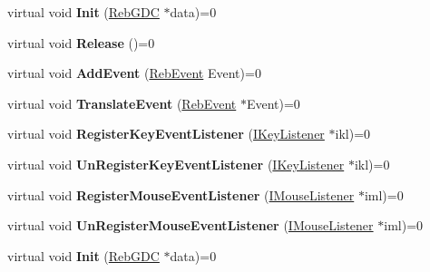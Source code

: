 \begin{DoxyCompactItemize}
\item 
virtual void {\bfseries Init} (\hyperlink{class_reb_g_d_c}{Reb\+G\+DC} $\ast$data)=0\hypertarget{class_i_m_e_h_a808b102bf9f8281aef8b4cb17652613c}{}\label{class_i_m_e_h_a808b102bf9f8281aef8b4cb17652613c}

\item 
virtual void {\bfseries Release} ()=0\hypertarget{class_i_m_e_h_ac47c3471945c993f1b4dfb35d8dd4a23}{}\label{class_i_m_e_h_ac47c3471945c993f1b4dfb35d8dd4a23}

\item 
virtual void {\bfseries Add\+Event} (\hyperlink{union_reb_event}{Reb\+Event} Event)=0\hypertarget{class_i_m_e_h_aa12fb49a27156061fe02c56b928963e5}{}\label{class_i_m_e_h_aa12fb49a27156061fe02c56b928963e5}

\item 
virtual void {\bfseries Translate\+Event} (\hyperlink{union_reb_event}{Reb\+Event} $\ast$Event)=0\hypertarget{class_i_m_e_h_aeb04da4f2405b896c93d299d0e17aa4c}{}\label{class_i_m_e_h_aeb04da4f2405b896c93d299d0e17aa4c}

\item 
virtual void {\bfseries Register\+Key\+Event\+Listener} (\hyperlink{class_i_key_listener}{I\+Key\+Listener} $\ast$ikl)=0\hypertarget{class_i_m_e_h_ae5c0421dd64b696ef51227254d18efe6}{}\label{class_i_m_e_h_ae5c0421dd64b696ef51227254d18efe6}

\item 
virtual void {\bfseries Un\+Register\+Key\+Event\+Listener} (\hyperlink{class_i_key_listener}{I\+Key\+Listener} $\ast$ikl)=0\hypertarget{class_i_m_e_h_a08078182c8d0b334e941a4314719fa68}{}\label{class_i_m_e_h_a08078182c8d0b334e941a4314719fa68}

\item 
virtual void {\bfseries Register\+Mouse\+Event\+Listener} (\hyperlink{class_i_mouse_listener}{I\+Mouse\+Listener} $\ast$iml)=0\hypertarget{class_i_m_e_h_a06ad1a6f9111d62e428c4047575323b2}{}\label{class_i_m_e_h_a06ad1a6f9111d62e428c4047575323b2}

\item 
virtual void {\bfseries Un\+Register\+Mouse\+Event\+Listener} (\hyperlink{class_i_mouse_listener}{I\+Mouse\+Listener} $\ast$iml)=0\hypertarget{class_i_m_e_h_a5f0ca9fd2c0e154eb7760b64ab2953a7}{}\label{class_i_m_e_h_a5f0ca9fd2c0e154eb7760b64ab2953a7}

\item 
virtual void {\bfseries Init} (\hyperlink{class_reb_g_d_c}{Reb\+G\+DC} $\ast$data)=0\hypertarget{class_i_m_e_h_a808b102bf9f8281aef8b4cb17652613c}{}\label{class_i_m_e_h_a808b102bf9f8281aef8b4cb17652613c}


\end{DoxyCompactItemize}
